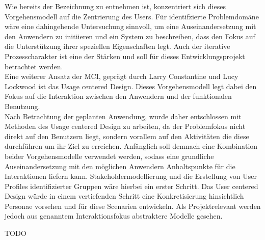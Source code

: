 Wie bereits der Bezeichnung zu entnehmen ist, konzentriert sich dieses Vorgehensmodell auf die Zentrierung des Users. Für identifzierte Problemdomäne wäre eine dahingehende Untersuchung sinnvoll, um eine  Auseinandersetzung mit den Anwendern zu initiieren und ein System zu beschreiben, dass den Fokus auf die Unterstützung ihrer speziellen Eigenschaften legt. Auch der iterative Prozesscharakter ist eine der Stärken und soll für dieses Entwicklungsprojekt betrachtet werden.\\
Eine weiterer Ansatz der MCI, geprägt durch Larry Constantine und Lucy Lockwood ist das Usage centered Design. Dieses Vorgehensmodell legt dabei den Fokus auf die Interaktion zwischen den Anwendern und der funktionalen Benutzung. \\
Nach Betrachtung der geplanten Anwendung, wurde daher entschlossen mit Methoden des Usage centered Design zu arbeiten, da der Problemfokus nicht direkt auf den Benutzern liegt, sondern vorallem auf den Aktivitäten die diese durchführen um ihr Ziel zu erreichen. Anfänglich soll demnach eine Kombination beider Vorgehensmodelle verwendet werden, sodass eine grundliche Auseinandersetzung mit den möglichen Anwendern Anhaltspunkte für die Interaktionen liefern kann. Stakeholdermodellierung und die Erstellung von User Profiles identifizierter Gruppen wäre hierbei ein erster Schritt. Das User centered Design würde in einem vertiefenden Schritt eine Konkretisierung hinsichtlich Personae vorsehen und für diese Scenarien entwickeln. Als Projektrelevant werden jedoch aus genanntem Interaktionsfokus abstraktere Modelle gesehen.

TODO


\newpage



\newpage



\newpage



\newpage



\newpage



\newpage
